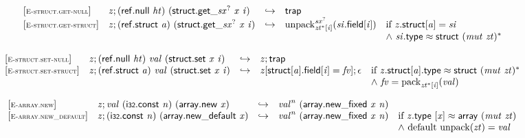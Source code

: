 $$
\begin{array}{@{}l@{}lcl@{}l@{}}
{[\textsc{\scriptsize E{-}struct.get{-}null}]} \quad & {\mathit{z}} ; (\mathsf{ref.null}~{\mathit{ht}})~({{\mathsf{struct.get}}{\mathsf{\_}}}{{{\mathit{sx}}^?}}~{\mathit{x}}~{\mathit{i}}) &\hookrightarrow& \mathsf{trap} &  \\
{[\textsc{\scriptsize E{-}struct.get{-}struct}]} \quad & {\mathit{z}} ; (\mathsf{ref.struct}~{\mathit{a}})~({{\mathsf{struct.get}}{\mathsf{\_}}}{{{\mathit{sx}}^?}}~{\mathit{x}}~{\mathit{i}}) &\hookrightarrow& {{{{\mathrm{unpack}}}_{{{\mathit{zt}}^\ast}{}[{\mathit{i}}]}^{{{\mathit{sx}}^?}}}}{({\mathit{si}}.\mathsf{field}{}[{\mathit{i}}])} &\quad
  \mbox{if}~{\mathit{z}}.\mathsf{struct}{}[{\mathit{a}}] = {\mathit{si}} \\
 &&&&\quad {\land}~{\mathit{si}}.\mathsf{type} \approx \mathsf{struct}~{({\mathit{mut}}~{\mathit{zt}})^\ast} \\
\end{array}
$$

\vspace{1ex}

$$
\begin{array}{@{}l@{}lcl@{}l@{}}
{[\textsc{\scriptsize E{-}struct.set{-}null}]} \quad & {\mathit{z}} ; (\mathsf{ref.null}~{\mathit{ht}})~{\mathit{val}}~(\mathsf{struct.set}~{\mathit{x}}~{\mathit{i}}) &\hookrightarrow& {\mathit{z}} ; \mathsf{trap} &  \\
{[\textsc{\scriptsize E{-}struct.set{-}struct}]} \quad & {\mathit{z}} ; (\mathsf{ref.struct}~{\mathit{a}})~{\mathit{val}}~(\mathsf{struct.set}~{\mathit{x}}~{\mathit{i}}) &\hookrightarrow& {\mathit{z}}{}[\mathsf{struct}{}[{\mathit{a}}].\mathsf{field}{}[{\mathit{i}}] = {\mathit{fv}}] ; \epsilon &\quad
  \mbox{if}~{\mathit{z}}.\mathsf{struct}{}[{\mathit{a}}].\mathsf{type} \approx \mathsf{struct}~{({\mathit{mut}}~{\mathit{zt}})^\ast} \\
 &&&&\quad {\land}~{\mathit{fv}} = {{\mathrm{pack}}}_{{{\mathit{zt}}^\ast}{}[{\mathit{i}}]}({\mathit{val}}) \\
\end{array}
$$

\vspace{1ex}

$$
\begin{array}{@{}l@{}lcl@{}l@{}}
{[\textsc{\scriptsize E{-}array.new}]} \quad & {\mathit{z}} ; {\mathit{val}}~(\mathsf{i{\scriptstyle32}}.\mathsf{const}~{\mathit{n}})~(\mathsf{array.new}~{\mathit{x}}) &\hookrightarrow& {{\mathit{val}}^{{\mathit{n}}}}~(\mathsf{array.new\_fixed}~{\mathit{x}}~{\mathit{n}}) &  \\
{[\textsc{\scriptsize E{-}array.new\_default}]} \quad & {\mathit{z}} ; (\mathsf{i{\scriptstyle32}}.\mathsf{const}~{\mathit{n}})~(\mathsf{array.new\_default}~{\mathit{x}}) &\hookrightarrow& {{\mathit{val}}^{{\mathit{n}}}}~(\mathsf{array.new\_fixed}~{\mathit{x}}~{\mathit{n}}) &\quad
  \mbox{if}~{\mathit{z}}.\mathsf{type}~{}[{\mathit{x}}] \approx \mathsf{array}~({\mathit{mut}}~{\mathit{zt}}) \\
 &&&&\quad {\land}~{\mathrm{default}}~{\mathrm{unpack}}({\mathit{zt}}) = {\mathit{val}} \\
\end{array}
$$


